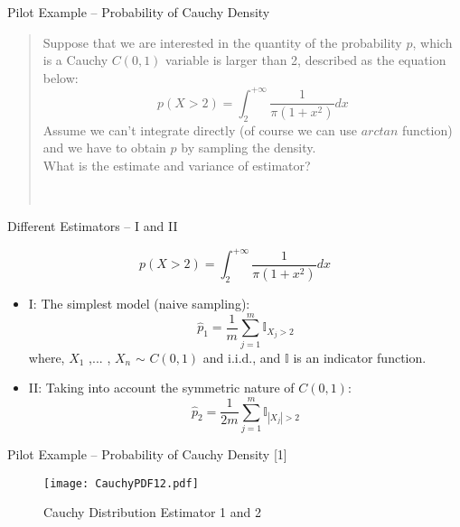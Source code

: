 \begin{frame}{Pilot Example -- Probability of Cauchy Density}

\begin{quote}
Suppose that we are interested in the quantity of the probability $p$, which is a Cauchy $C(0,1)$ variable is larger than 2, described as the equation below:\\
\[
p(X>2) = \int_{2}^{+\infty }\frac{1}{\pi (1+x^{2})}dx
\]
Assume we can't integrate directly (of course we can use $arctan$ function) and we have to obtain $p$ by sampling the density.\\
What is the estimate and variance of estimator?
\begin{flushright}
\textbf{}\\

\end{flushright}
\end{quote}
\end{frame}

\begin{frame}{Different Estimators -- I and II}

\[
\boxed{
p(X>2) = \int_{2}^{+\infty }\frac{1}{\pi (1+x^{2})}dx}
\]

\begin{itemize}
\item I: The simplest model (naive sampling):\\ \[
\hat{p}_{1}=\frac{1}{m}\sum_{j=1}^{m}\mathbb{I}_{X_{j}>2}
\]
where, $X_{1}$ ,$...$ , $X_{n}$ $\sim$ $C(0,1)$ and i.i.d., and $\mathbb{I}$ is an indicator function. 
\item II: Taking into account the symmetric nature of $C(0,1)$:\\ \[\hat{p}_{2} = \frac{1}{2m}\sum_{j=1}^{m}\mathbb{I}_{\left | X_{j} \right |>2}\]

\end{itemize}
\end{frame}

\begin{frame}{Pilot Example -- Probability of Cauchy Density [1]}

\begin{figure}[ht]
		  \centering
          \texttt{[image: CauchyPDF12.pdf]}
           \caption{Cauchy Distribution Estimator 1 and 2}
\end{figure}

\end{frame}

